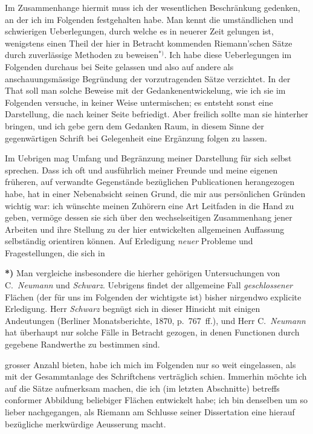 \documentclass{article}
\begin{document}
Im Zusammenhange hiermit muss ich der wesentlichen Beschränkung gedenken, an der ich im Folgenden festgehalten habe. Man kennt die umständlichen und schwierigen Ueberlegungen, durch welche es in neuerer Zeit gelungen ist, wenigstens einen Theil der hier in Betracht kommenden Riemann'schen Sätze durch zuverlässige Methoden zu beweisen${}^{*)}$. Ich habe diese Ueberlegungen im Folgenden durchaus bei Seite gelassen und also auf andere als anschauungsmässige Begründung der vorzutragenden Sätze verzichtet. In der That soll man solche Beweise mit der Gedankenentwickelung, wie ich sie im Folgenden versuche, in keiner Weise untermischen; es entsteht sonst eine Darstellung, die nach keiner Seite befriedigt. Aber freilich sollte man sie hinterher bringen, und ich gebe gern dem Gedanken Raum, in diesem Sinne der gegenwärtigen Schrift bei Gelegenheit eine Ergänzung folgen zu lassen.

Im Uebrigen mag Umfang und Begränzung meiner Darstellung für sich selbst sprechen. Dass ich oft und ausführlich meiner Freunde und meine eigenen früheren, auf verwandte Gegenstände bezüglichen Publicationen herangezogen habe, hat in einer Nebenabsicht seinen Grund, die mir aus persönlichen Gründen wichtig war: ich wünschte meinen Zuhörern eine Art Leitfaden in die Hand zu geben, vermöge dessen sie sich über den wechselseitigen Zusammenhang jener Arbeiten und ihre Stellung zu der hier entwickelten allgemeinen Auffassung selbständig orientiren können. Auf Erledigung \emph{neuer} Probleme und Fragestellungen, die sich in

\textbf{*)} Man vergleiche insbesondere die hierher gehörigen Untersuchungen von C.\ \emph{Neumann} und \emph{Schwarz}. Uebrigens findet der allgemeine Fall \emph{geschlossener} Flächen (der für uns im Folgenden der wichtigste ist) bisher nirgendwo explicite Erledigung. Herr \emph{Schwarz} begnügt sich in dieser Hinsicht mit einigen Andeutungen (Berliner Monatsberichte, 1870, p.~767~ff.), und Herr C.\ \emph{Neumann} hat überhaupt nur solche Fälle in Betracht gezogen, in denen Functionen durch gegebene Randwerthe zu bestimmen sind.

grosser Anzahl bieten, habe ich mich im Folgenden nur so weit eingelassen, als mit der Gesammtanlage des Schriftchens verträglich schien. Immerhin möchte ich auf die Sätze aufmerksam machen, die ich (im letzten Abschnitte) betreffs conformer Abbildung beliebiger Flächen entwickelt habe; ich bin denselben um so lieber nachgegangen, als Riemann am Schlusse seiner Dissertation eine hierauf bezügliche merkwürdige Aeusserung macht.
\end{document}
